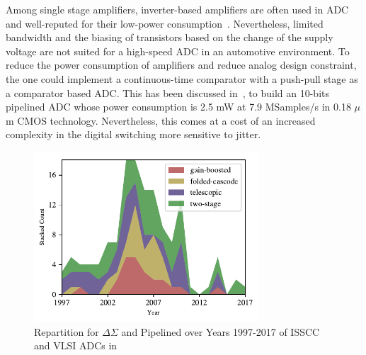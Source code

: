Among single stage amplifiers, inverter-based amplifiers are often used in ADC and well-reputed for their low-power consumption~\cite{Selby2013,Ismail2016}. Nevertheless, limited bandwidth and the biasing of transistors based on the change of the supply voltage are not suited for a high-speed ADC in an automotive environment.
To reduce the power consumption of amplifiers and reduce analog design constraint, the one could implement a continuous-time comparator with a push-pull stage as a comparator based ADC\@. This has been discussed in~\cite{Fiorenza2006}, to build an 10-bits pipelined ADC whose power consumption is 2.5 mW at 7.9 MSamples/s in 0.18 \(\mu \)m CMOS technology. Nevertheless, this comes at a cost of an increased complexity in the digital switching more sensitive to jitter. 

\begin{figure}[htp]
    \centering
    \includegraphics[width=0.75\textwidth]{Chapter7/Figs/amplifier_repartition.pdf}
    \caption{Repartition for \(\Delta\Sigma \) and Pipelined over Years 1997-2017 of ISSCC and VLSI ADCs in \cite{MurmannSurvey}}
    \label{fig:ota_over_year}
\end{figure}

